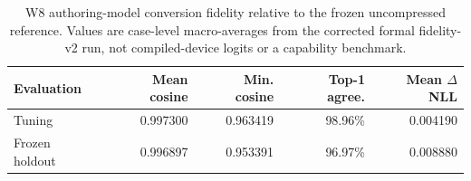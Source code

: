 \begin{table}[H]
\centering
\small
\setlength{\tabcolsep}{4pt}
\begin{tabular}{@{}lrrrr@{}}
\toprule
Evaluation & Mean cosine & Min. cosine & Top-1 agree. & Mean $\Delta$NLL \\
\midrule
Tuning & 0.997300 & 0.963419 & 98.96\% & 0.004190 \\
Frozen holdout & 0.996897 & 0.953391 & 96.97\% & 0.008880 \\
\bottomrule
\end{tabular}
\caption{W8 authoring-model conversion fidelity relative to the frozen uncompressed reference. Values are case-level macro-averages from the corrected formal fidelity-v2 run, not compiled-device logits or a capability benchmark. }
\label{tab:w8-fidelity}
\end{table}
